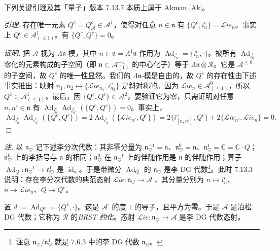 
下列关键引理及其「量子」版本 7.13.7 本质上属于 Akman [Ak]。

 \emph{引理.} 存在唯一元素 $Q^{c}=Q^{c}_{\mathcal{A}}\in\mathcal{A}^{1}$，使得对任意 $n\in\mathfrak{n}$ 有 $\{Q^{c},i^{c}_n\}=\mathcal{L}ie_n$。事实上 $Q^{c}\in\mathcal{A}^{1}_{(\le1)}$。有 $\{Q^{c},Q^{c}\}=0$。

\emph{证明.} 把 $\mathcal{A}$ 视为 $\Lambda\mathfrak{n}$-模，其中 $n\in\mathfrak{n}=\Lambda^{1}\mathfrak{n}$ 作用为 $\operatorname{Ad}_{i^{c}_n}=\{i^{c}_n,\cdot\}$。被所有 $\operatorname{Ad}_{i^{c}_n}$ 零化的元素构成的子空间（即 $\mathfrak{n}\subset\mathcal{A}^{-1}_{(1)}$ 的中心化子）等于 $\Lambda\mathfrak{n}\otimes\mathcal{R}$。它是 $\mathcal{A}^{\le0}$ 的子空间，故 $Q^{c}$ 的唯一性显然。我们的 $\Lambda\mathfrak{n}$-模是自由的，故 $Q^{c}$ 的存在性由下述事实推出：映射 $n_1,n_2\mapsto\{\mathcal{L}ie_{n_1},i^{c}_{n_2}\}$ 是斜对称的。因为 $\mathcal{L}ie_n\in\mathcal{A}^{0}_{(\le1)}$，所以 $Q^{c}\in\mathcal{A}^{1}_{(\le1)}$。最后，因 $\{Q^{c},Q^{c}\}\in\mathcal{A}^{2}$，要验证它为零，只需证明对任意 $n,n'\in\mathfrak{n}$ 有 $\operatorname{Ad}_{i^{c}_n}\operatorname{Ad}_{i^{c}_{n'}}(\{Q^{c},Q^{c}\})=0$。事实上，
\[
\operatorname{Ad}_{i^{c}_n}\operatorname{Ad}_{i^{c}_{n'}}(\{Q^{c},Q^{c}\})
=2\operatorname{Ad}_{i^{c}_n}(\{\mathcal{L}ie_{n'},Q^{c}\})
=2\{i^{c}_{[n,n']},Q^{c}\}+2\{\mathcal{L}ie_{n'},\mathcal{L}ie_n\}=0.
\]
\hfill$\Box$

\emph{注.} 以 $\mathfrak{n}_{\heartsuit}$ 记下述李分次代数：其非零分量为 $\mathfrak{n}^{-1}_{\heartsuit}=\mathfrak{n}$、$\mathfrak{n}^{0}_{\heartsuit}=\mathfrak{n}$、$\mathfrak{n}^{1}_{\heartsuit}=\mathbb{C}=\mathbb{C}\cdot Q$；$\mathfrak{n}^{0}_{\heartsuit}$ 上的李括号与 $\mathfrak{n}$ 的相同；$\mathfrak{n}^{0}_{\heartsuit}$ 在 $\mathfrak{n}^{-1}_{\heartsuit}$ 上的伴随作用是 $\mathfrak{n}$ 的伴随作用；算子 $\operatorname{Ad}_{Q}:\mathfrak{n}^{-1}_{\heartsuit}\to\mathfrak{n}^{0}_{\heartsuit}$ 是 $\operatorname{id}_{\mathfrak{n}}$。于是带微分 $\operatorname{Ad}_{Q}$ 的 $\mathfrak{n}_{\heartsuit}$ 是李 DG 代数\footnote{注意 $\mathfrak{n}_{\heartsuit}/\mathfrak{n}^{1}_{\heartsuit}$ 就是 7.6.3 中的李 DG 代数 $\mathfrak{n}_{\Omega}$。}。此时 7.13.3 说明：存在李分次代数的典范态射 $\mathcal{L}ie:\mathfrak{n}_{\heartsuit}\to\mathcal{A}^{\cdot}$，其分量分别为 $n\mapsto i^{c}_n$、$n\mapsto\mathcal{L}ie_n$、$Q\mapsto Q^{c}$。

 置 $d:=\operatorname{Ad}_{Q^{c}}=\{Q^{c},\cdot\}$。这是 $\mathcal{A}^{\cdot}$ 的度 $1$ 的导子，且平方为零。于是 $\mathcal{A}$ 是泊松 DG 代数；它称为 $\mathcal{R}$ 的\emph{BRST 约化}。态射 $\mathcal{L}ie:\mathfrak{n}_{\heartsuit}\to\mathcal{A}$ 是李 DG 代数态射。

